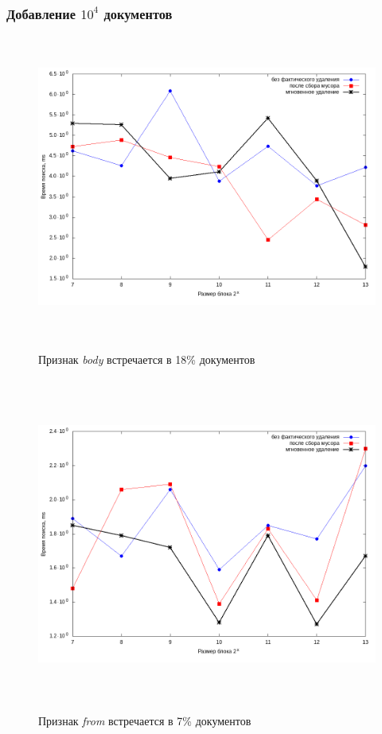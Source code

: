 \subsubsection{Добавление $10^4$ документов}

\begin{figure}[H]
\includegraphics[width=\linewidth, height=10cm]{fig/limit_1e6/1e4/body.png}
\caption{Признак \textit{body} встречается в 18\% документов}
\includegraphics[width=\linewidth, height=11cm]{fig/limit_1e6/1e4/from.png}
\caption{Признак \textit{from} встречается в 7\% документов}
\end{figure}

